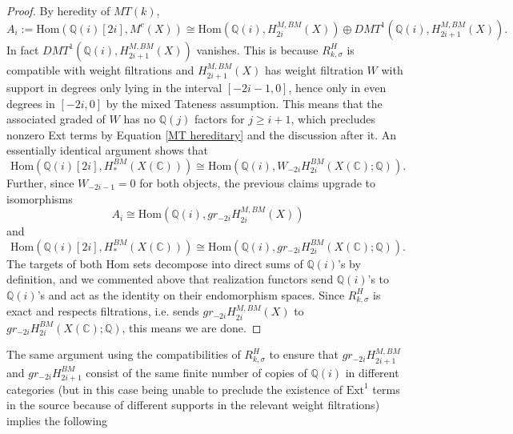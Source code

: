 \documentclass[11pt]{amsart}
\theoremstyle{definition}
\theoremstyle{remark}
\newcommand{\Hom}{\mathrm{Hom}}
\numberwithin{equation}{section}
\begin{document}
\begin{proof}
    By heredity of $MT(k)$, \begin{equation}
        A_i := \Hom(\mathbb{Q}(i)[2i], M^c(X)) \cong \Hom(\mathbb{Q}(i), H_{2i}^{M, BM}(X)) \oplus DMT^1(\mathbb{Q}(i), H_{2i+1}^{M, BM}(X)).
    \end{equation} In fact $DMT^1(\mathbb{Q}(i), H_{2i+1}^{M, BM}(X))$ vanishes. This is because $R^H_{k,\sigma}$ is compatible with weight filtrations and $H_{2i+1}^{M, BM}(X)$ has weight filtration $W$ with support in degrees only lying in the interval $[-2i - 1, 0]$, hence only in even degrees in $[-2i, 0]$ by the mixed Tateness assumption. This means that the associated graded of $W$ has no $\mathbb{Q}(j)$ factors for $j \geq i + 1$, which precludes nonzero Ext terms by Equation \ref{MT hereditary} and the discussion after it. An essentially identical argument shows that \begin{equation}
        \Hom(\mathbb{Q}(i)[2i], H_*^{BM}(X(\mathbb{C}))) \cong \Hom(\mathbb{Q}(i), W_{-2i}H_{2i}^{BM}(X(\mathbb{C}); \mathbb{Q})).
    \end{equation}
    Further, since $W_{-2i - 1} = 0$ for both objects, the previous claims upgrade to isomorphisms \begin{equation}
        A_i \cong \Hom(\mathbb{Q}(i), gr_{-2i}H_{2i}^{M, BM}(X))
    \end{equation} \noindent and \begin{equation}
        \Hom(\mathbb{Q}(i)[2i], H_*^{BM}(X(\mathbb{C}))) \cong \Hom(\mathbb{Q}(i), gr_{-2i}H_{2i}^{BM}(X(\mathbb{C}); \mathbb{Q})).
    \end{equation} The targets of both Hom sets decompose into direct sums of $\mathbb{Q}(i)$'s by definition, and we commented above that realization functors send $\mathbb{Q}(i)$'s to $\mathbb{Q}(i)$'s and act as the identity on their endomorphism spaces. Since $R^H_{k, \sigma}$ is exact and respects filtrations, i.e. sends $gr_{-2i}H_{2i}^{M, BM}(X)$ to $gr_{-2i}H_{2i}^{BM}(X(\mathbb{C});\mathbb{Q})$, this means we are done.
\end{proof}

The same argument using the compatibilities of $R^H_{k,\sigma}$ to ensure that $gr_{-2i}H_{2i+1}^{M,BM}$ and $gr_{-2i}H_{2i+1}^{BM}$ consist of the same finite number of copies of $\mathbb{Q}(i)$ in different categories (but in this case being unable to preclude the existence of $\text{Ext}^1$ terms in the source because of different supports in the relevant weight filtrations) implies the following
\end{document}
